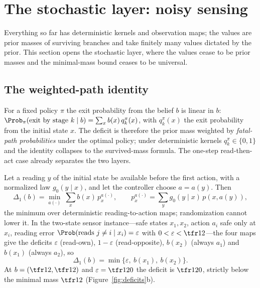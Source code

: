 \section{The stochastic layer: noisy sensing}\label{sec:stochastic}

Everything so far has deterministic kernels and observation maps; the values are prior masses of surviving branches and take finitely many values dictated by the prior. This section opens the stochastic layer, where the values cease to be prior masses and the minimal-mass bound ceases to be universal.

\subsection{The weighted-path identity}

For a fixed policy $\pi$ the exit probability from the belief $b$ is linear in $b$: $\Prob_\pi(\text{exit by stage }k\mid b)=\sum_x b(x)\,q^{\pi}_k(x)$, with $q^{\pi}_k(x)$ the exit probability from the initial state $x$. The deficit is therefore the prior mass weighted by \emph{fatal-path probabilities} under the optimal policy; under deterministic kernels $q^{\pi}_k\in\{0,1\}$ and the identity collapses to the survived-mass formula. The one-step read-then-act case already separates the two layers.

\begin{proposition}\label{prop:pathdeficit}
Let a reading $y$ of the initial state be available before the first action, with a normalized law $g_0(y\mid x)$, and let the controller choose $a=a(y)$. Then
\begin{equation}\label{eq:pathdeficit}
\Delta_1(b)=\min_{a(\cdot)}\ \sum_{x}b(x)\,p^{a(\cdot)}_x,\qquad p^{a(\cdot)}_x=\sum_y g_0(y\mid x)\,p(x,a(y)),
\end{equation}
the minimum over deterministic reading-to-action maps; randomization cannot lower it. In the two-state sensor instance---safe states $x_1,x_2$, action $a_i$ safe only at $x_i$, reading error $\Prob(\text{reads }j\neq i\mid x_i)=\varepsilon$ with $0<\varepsilon<\tfr12$---the four maps give the deficits $\varepsilon$ (read-own), $1-\varepsilon$ (read-opposite), $b(x_2)$ (always $a_1$) and $b(x_1)$ (always $a_2$), so
\begin{equation}\label{eq:sensor}
\Delta_1(b)=\min\{\varepsilon,\ b(x_1),\ b(x_2)\}.
\end{equation}
At $b=(\tfr12,\tfr12)$ and $\varepsilon=\tfr1{20}$ the deficit is $\tfr1{20}$, strictly below the minimal mass $\tfr12$ (Figure~\ref{fig:deficits}b).
\end{proposition}


